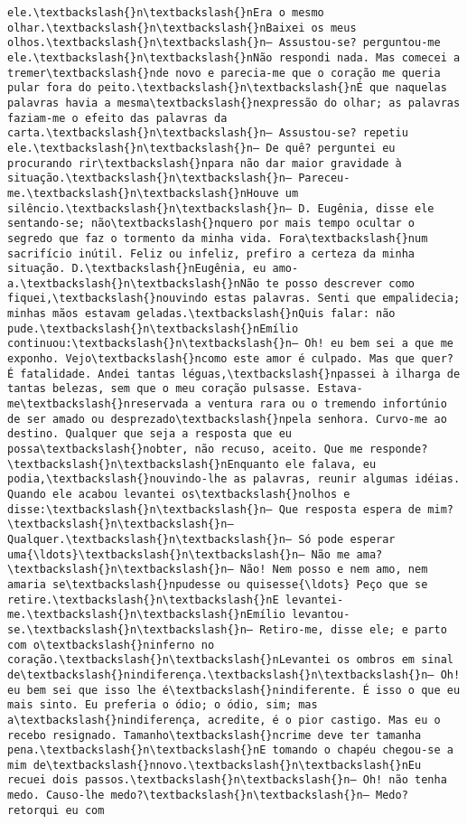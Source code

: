 \begin{Verbatim}[commandchars=\\\{\}]
ele.\textbackslash{}n\textbackslash{}nEra o mesmo olhar.\textbackslash{}n\textbackslash{}nBaixei os meus olhos.\textbackslash{}n\textbackslash{}n— Assustou-se? perguntou-me ele.\textbackslash{}n\textbackslash{}nNão respondi nada. Mas comecei a tremer\textbackslash{}nde novo e parecia-me que o coração me queria pular fora do peito.\textbackslash{}n\textbackslash{}nÉ que naquelas palavras havia a mesma\textbackslash{}nexpressão do olhar; as palavras faziam-me o efeito das palavras da carta.\textbackslash{}n\textbackslash{}n— Assustou-se? repetiu ele.\textbackslash{}n\textbackslash{}n— De quê? perguntei eu procurando rir\textbackslash{}npara não dar maior gravidade à situação.\textbackslash{}n\textbackslash{}n— Pareceu-me.\textbackslash{}n\textbackslash{}nHouve um silêncio.\textbackslash{}n\textbackslash{}n— D. Eugênia, disse ele sentando-se; não\textbackslash{}nquero por mais tempo ocultar o segredo que faz o tormento da minha vida. Fora\textbackslash{}num sacrifício inútil. Feliz ou infeliz, prefiro a certeza da minha situação. D.\textbackslash{}nEugênia, eu amo-a.\textbackslash{}n\textbackslash{}nNão te posso descrever como fiquei,\textbackslash{}nouvindo estas palavras. Senti que empalidecia; minhas mãos estavam geladas.\textbackslash{}nQuis falar: não pude.\textbackslash{}n\textbackslash{}nEmílio continuou:\textbackslash{}n\textbackslash{}n— Oh! eu bem sei a que me exponho. Vejo\textbackslash{}ncomo este amor é culpado. Mas que quer? É fatalidade. Andei tantas léguas,\textbackslash{}npassei à ilharga de tantas belezas, sem que o meu coração pulsasse. Estava-me\textbackslash{}nreservada a ventura rara ou o tremendo infortúnio de ser amado ou desprezado\textbackslash{}npela senhora. Curvo-me ao destino. Qualquer que seja a resposta que eu possa\textbackslash{}nobter, não recuso, aceito. Que me responde?\textbackslash{}n\textbackslash{}nEnquanto ele falava, eu podia,\textbackslash{}nouvindo-lhe as palavras, reunir algumas idéias. Quando ele acabou levantei os\textbackslash{}nolhos e disse:\textbackslash{}n\textbackslash{}n— Que resposta espera de mim?\textbackslash{}n\textbackslash{}n— Qualquer.\textbackslash{}n\textbackslash{}n— Só pode esperar uma{\ldots}\textbackslash{}n\textbackslash{}n— Não me ama?\textbackslash{}n\textbackslash{}n— Não! Nem posso e nem amo, nem amaria se\textbackslash{}npudesse ou quisesse{\ldots} Peço que se retire.\textbackslash{}n\textbackslash{}nE levantei-me.\textbackslash{}n\textbackslash{}nEmílio levantou-se.\textbackslash{}n\textbackslash{}n— Retiro-me, disse ele; e parto com o\textbackslash{}ninferno no coração.\textbackslash{}n\textbackslash{}nLevantei os ombros em sinal de\textbackslash{}nindiferença.\textbackslash{}n\textbackslash{}n— Oh! eu bem sei que isso lhe é\textbackslash{}nindiferente. É isso o que eu mais sinto. Eu preferia o ódio; o ódio, sim; mas a\textbackslash{}nindiferença, acredite, é o pior castigo. Mas eu o recebo resignado. Tamanho\textbackslash{}ncrime deve ter tamanha pena.\textbackslash{}n\textbackslash{}nE tomando o chapéu chegou-se a mim de\textbackslash{}nnovo.\textbackslash{}n\textbackslash{}nEu recuei dois passos.\textbackslash{}n\textbackslash{}n— Oh! não tenha medo. Causo-lhe medo?\textbackslash{}n\textbackslash{}n— Medo? retorqui eu com 
\end{Verbatim}
